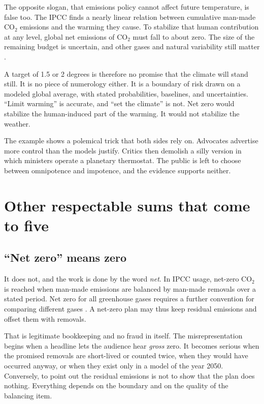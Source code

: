 \documentclass[12pt,a4paper]{book}
\begin{document}
The opposite slogan, that emissions policy cannot affect future temperature, is false too. The IPCC finds a nearly linear relation between cumulative man-made CO$_2$ emissions and the warming they cause. To stabilize that human contribution at any level, global net emissions of CO$_2$ must fall to about zero. The size of the remaining budget is uncertain, and other gases and natural variability still matter \cite{IPCCWGI2021TechnicalSummary}.

A target of 1.5 or 2 degrees is therefore no promise that the climate will stand still. It is no piece of numerology either. It is a boundary of risk drawn on a modeled global average, with stated probabilities, baselines, and uncertainties. ``Limit warming'' is accurate, and ``set the climate'' is not. Net zero would stabilize the human-induced part of the warming. It would not stabilize the weather.

The example shows a polemical trick that both sides rely on. Advocates advertise more control than the models justify. Critics then demolish a silly version in which ministers operate a planetary thermostat. The public is left to choose between omnipotence and impotence, and the evidence supports neither.

\section{Other respectable sums that come to five}

\subsection{``Net zero'' means zero}

It does not, and the work is done by the word \emph{net}. In IPCC usage, net-zero CO$_2$ is reached when man-made emissions are balanced by man-made removals over a stated period. Net zero for all greenhouse gases requires a further convention for comparing different gases \cite{IPCCWGI2021TechnicalSummary}. A net-zero plan may thus keep residual emissions and offset them with removals.

That is legitimate bookkeeping and no fraud in itself. The misrepresentation begins when a headline lets the audience hear \emph{gross} zero. It becomes serious when the promised removals are short-lived or counted twice, when they would have occurred anyway, or when they exist only in a model of the year 2050. Conversely, to point out the residual emissions is not to show that the plan does nothing. Everything depends on the boundary and on the quality of the balancing item.
\end{document}
